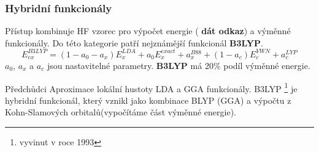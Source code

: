 \documentclass[
  digital, %
  table,   %
  lof,     %
  lot,     %
]{fithesis3}
\begin{document}
\subsubsection{Hybridní funkcionály}
Přístup kombinuje HF vzorec pro výpočet energie ( \textbf{dát odkaz}) a výměnné funkcionály. 
Do této kategorie patří nejznámější funkcionál \textbf{B3LYP}.
\begin{equation}
E_{ex}^{B3LYP} = (1-a_0-a_x)E_x^{LDA} + a_0E_x^{exact} + a_x^{B88} + (1-a_c)E_c^{VWN} + a_c^{LYP}
\label{B3LYP_rovnice}
\end{equation}
$a_0$, $a_x$ a $a_c$ jsou nastavitelné parametry. \textbf{B3LYP} má 20\% podíl výměnné energie. \cite{dftshrnutivysledky}




Předchůdci Aproximace lokální hustoty LDA a GGA funkcionály. B3LYP \footnote{vyvinut v roce 1993} je hybridní funkcionál, který vznikl jako kombinace BLYP (GGA) a výpočtu z Kohn-Slamových orbitalů(vypočítáme část výměnné energie).
\end{document}
